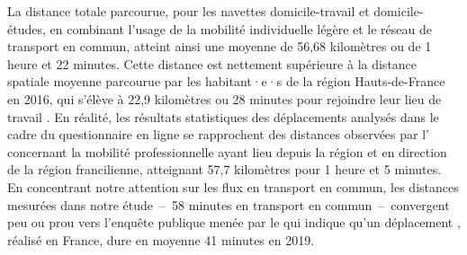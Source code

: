 \begin{refsegment}
La distance totale parcourue, pour les navettes domicile-travail et domicile-études, en combinant l'usage de la mobilité individuelle légère et le réseau de transport en commun, atteint ainsi une moyenne de 56,68 kilomètres ou de 1 heure et 22 minutes. Cette distance est nettement supérieure à la distance spatiale moyenne parcourue par les habitant·e·s de la région Hauts-de-France en 2016, qui s'élève à 22,9 kilomètres ou 28 minutes pour rejoindre leur lieu de travail \textcolor{blue}{\autocite{insee_premiere_2016}}. En réalité, les résultats statistiques des déplacements analysés dans le cadre du questionnaire en ligne se rapprochent des distances observées par l'\textcolor{blue}{\textcite{insee_premiere_2016}} concernant la mobilité professionnelle ayant lieu depuis la région et en direction de la région francilienne, atteignant 57,7 kilomètres pour 1 heure et 5 minutes. En concentrant notre attention sur les flux en transport en commun, les distances mesurées dans notre étude~–~58 minutes en transport en commun~–~convergent peu ou prou vers l'enquête publique menée par le \textcolor{blue}{\textcite{ministere_de_la_transition_ecologique_et_de_la_cohesion_des_territoires_mobilite_2023}} qui indique qu'un déplacement , réalisé en France, dure en moyenne 41 minutes en 2019.%


\end{refsegment}
